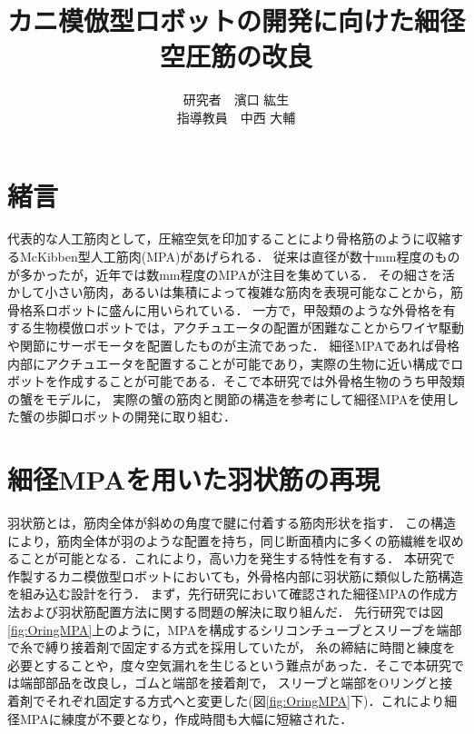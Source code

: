 \documentclass{jarticle}
\begin{document}

\title{
カニ模倣型ロボットの開発に向けた細径空圧筋の改良
}
\author{
\centering
研究者　濱口 紘生\\
\centering
指導教員　中西 大輔
}

\maketitle

\thispagestyle{empty}  %

\section{緒言}

代表的な人工筋肉として，圧縮空気を印加することにより骨格筋のように収縮するMcKibben型人工筋肉(MPA)があげられる．
従来は直径が数十mm程度のものが多かったが，近年では数mm程度のMPAが注目を集めている\cite{wakimoto}．
その細さを活かして小さい筋肉，あるいは集積によって複雑な筋肉を表現可能なことから，筋骨格系ロボットに盛んに用いられている\cite{wakimoto}．
一方で，甲殻類のような外骨格を有する生物模倣ロボットでは，アクチュエータの配置が困難なことからワイヤ駆動や関節にサーボモータを配置したものが主流であった\cite{crabrobot1}．
細径MPAであれば骨格内部にアクチュエータを配置することが可能であり，実際の生物に近い構成でロボットを作成することが可能である．そこで本研究では外骨格生物のうち甲殻類の蟹をモデルに，
実際の蟹の筋肉と関節の構造を参考にして細径MPAを使用した蟹の歩脚ロボットの開発に取り組む．

\section{細径MPAを用いた羽状筋の再現}
羽状筋とは，筋肉全体が斜めの角度で腱に付着する筋肉形状を指す．
この構造により，筋肉全体が羽のような配置を持ち，同じ断面積内に多くの筋繊維を収めることが可能となる．これにより，高い力を発生する特性を有する．
本研究で作製するカニ模倣型ロボットにおいても，外骨格内部に羽状筋に類似した筋構造を組み込む設計を行う．
まず，先行研究\cite{crabrobot1}において確認された細径MPAの作成方法および羽状筋配置方法に関する問題の解決に取り組んだ．
先行研究\cite{crabrobot1}では図\ref{fig:OringMPA}上のように，MPAを構成するシリコンチューブとスリーブを端部で糸で縛り接着剤で固定する方式を採用していたが，
糸の締結に時間と練度を必要とすることや，度々空気漏れを生じるという難点があった．そこで本研究では端部部品を改良し，ゴムと端部を接着剤で，
スリーブと端部をOリングと接着剤でそれぞれ固定する方式へと変更した(図\ref{fig:OringMPA}下)．これにより細径MPAに練度が不要となり，作成時間も大幅に短縮された．
\end{document}
